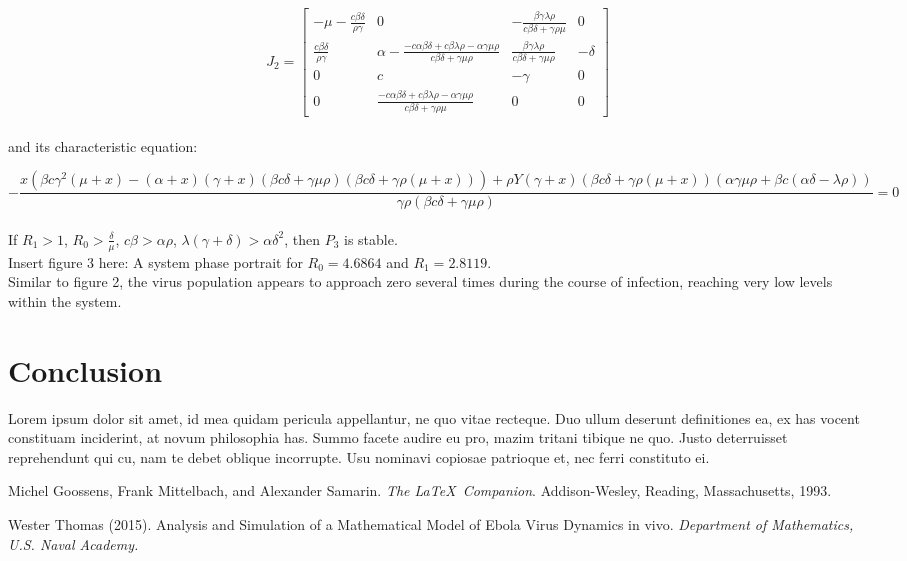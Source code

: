 \documentclass{article}
\begin{document}
\[J_{2} =
	\begin{bmatrix}
		- \mu - \frac{c \beta \delta}{\rho \gamma} & 0 & - \frac{\beta \gamma \lambda \rho}{c \beta \delta + \gamma \rho \mu} & 0 \\
		\frac{c \beta \delta}{\rho \gamma} & \alpha - \frac{-c \alpha \beta \delta + c \beta \lambda \rho - \alpha \gamma \mu \rho}{c \beta \delta + \gamma \mu \rho} & \frac{\beta \gamma \lambda \rho}{c \beta \delta + \gamma \mu \rho} & - \delta \\
		0 & c & - \gamma & 0 \\
		0 & \frac{-c \alpha \beta \delta + c \beta \lambda \rho - \alpha \gamma \mu \rho}{c \beta \delta + \gamma \rho \mu} & 0 & 0
	\end{bmatrix}
\]\\

and its characteristic equation:

\begin{equation}
	- \frac{x(\beta c \gamma^2(\mu + x) - (\alpha + x)(\gamma + x)(\beta c \delta + \gamma \mu \rho)(\beta c \delta + \gamma \rho (\mu + x))) + \rho Y(\gamma + x)(\beta c \delta + \gamma \rho (\mu + x))(\alpha \gamma \mu \rho + \beta c(\alpha \delta - \lambda \rho))}{\gamma \rho(\beta c \delta + \gamma \mu \rho)} = 0
\end{equation}\\

If $R_{1} > 1$, $R_{0} > \frac{\delta}{\mu}$, $c \beta > \alpha \rho$, $\lambda (\gamma + \delta) > \alpha \delta^2$, then $P_{3}$ is stable.\\

Insert figure 3 here: A system phase portrait for $R_{0} = 4.6864$ and $R_{1} = 2.8119$.\\
Similar to figure 2, the virus population appears to approach zero several times during the course of infection, reaching very low levels within the system.


\section{Conclusion}
\label{sub:Conclusion}
Lorem ipsum dolor sit amet, id mea quidam pericula appellantur, ne quo vitae recteque. Duo ullum deserunt definitiones ea, ex has vocent constituam inciderint, at novum philosophia has. Summo facete audire eu pro, mazim tritani tibique ne quo. Justo deterruisset reprehendunt qui cu, nam te debet oblique incorrupte. Usu nominavi copiosae patrioque et, nec ferri constituto ei.



\begin{thebibliography}{9}
Michel Goossens, Frank Mittelbach, and Alexander Samarin. 
\textit{The \LaTeX\ Companion}. 
Addison-Wesley, Reading, Massachusetts, 1993.

Wester Thomas (2015).
Analysis and Simulation of a Mathematical Model of Ebola Virus Dynamics in vivo. 
\textit{Department of Mathematics, U.S. Naval Academy.}
\end{thebibliography}
\end{document}
